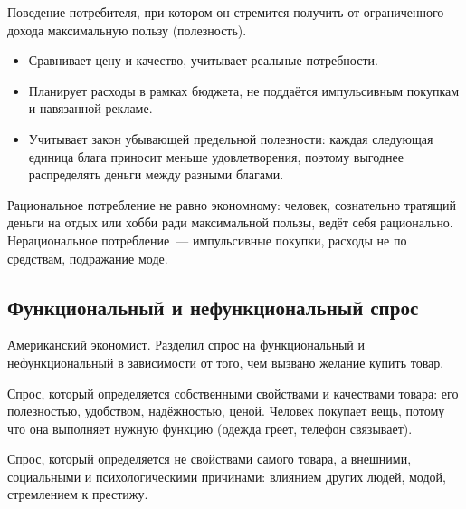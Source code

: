 \documentclass[12pt]{article}
\begin{document}
	\begin{definition}
		Поведение потребителя, при котором он стремится получить от ограниченного дохода максимальную пользу (полезность).
	\end{definition}
	
	\begin{itemize}
		\item Сравнивает цену и качество, учитывает реальные потребности.
		\item Планирует расходы в рамках бюджета, не поддаётся импульсивным покупкам и навязанной рекламе.
		\item Учитывает закон убывающей предельной полезности: каждая следующая единица блага приносит меньше удовлетворения, поэтому выгоднее распределять деньги между разными благами.
	\end{itemize}
	
	\begin{note}
		Рациональное потребление не равно экономному: человек, сознательно тратящий деньги на отдых или хобби ради максимальной пользы, ведёт себя рационально. Нерациональное потребление~--- импульсивные покупки, расходы не по средствам, подражание моде.
	\end{note}

	\subsection{Функциональный и нефункциональный спрос}
	
	\begin{person}
		Американский экономист. Разделил спрос на функциональный и нефункциональный в зависимости от того, чем вызвано желание купить товар.
	\end{person}
	
	\begin{definition}
		Спрос, который определяется собственными свойствами и качествами товара: его полезностью, удобством, надёжностью, ценой. Человек покупает вещь, потому что она выполняет нужную функцию (одежда греет, телефон связывает).
	\end{definition}
	
	\begin{definition}
		Спрос, который определяется не свойствами самого товара, а внешними, социальными и психологическими причинами: влиянием других людей, модой, стремлением к престижу.
	\end{definition}
	
\end{document}
